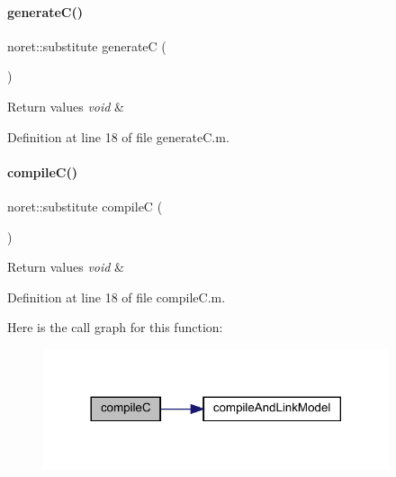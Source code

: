 \paragraph{\texorpdfstring{generateC()}{generateC()}}
{\footnotesize\ttfamily noret\+::substitute generateC (\begin{DoxyParamCaption}{ }\end{DoxyParamCaption})}


\begin{DoxyRetVals}{Return values}
{\em void} & \\
\hline
\end{DoxyRetVals}


Definition at line 18 of file generate\+C.\+m.

\mbox{\label{classamimodel_abf720a0c3104977029538e3b19d429bb}} 
\paragraph{\texorpdfstring{compileC()}{compileC()}}
{\footnotesize\ttfamily noret\+::substitute compileC (\begin{DoxyParamCaption}{ }\end{DoxyParamCaption})}


\begin{DoxyRetVals}{Return values}
{\em void} & \\
\hline
\end{DoxyRetVals}


Definition at line 18 of file compile\+C.\+m.

Here is the call graph for this function\+:
\nopagebreak
\begin{figure}[H]
\begin{center}
\leavevmode
\includegraphics[width=288pt]{classamimodel_abf720a0c3104977029538e3b19d429bb_cgraph}
\end{center}
\end{figure}
\mbox{\label{classamimodel_a6e93ea24824d9d90c322960e6d78fed0}} 
